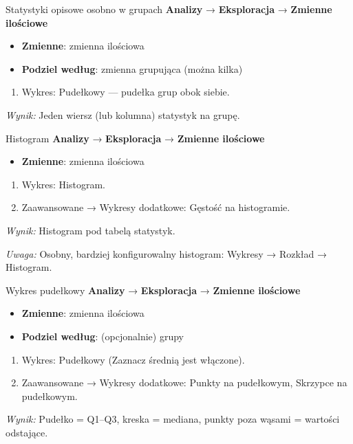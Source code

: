 \documentclass[
  polish,
  10pt,
  a4paper,
  DIV=11,
  numbers=noendperiod]{scrartcl}
\newcommand{\jmenu}[1]{{\color{upwraccent}\small #1}}
\begin{document}
\begin{jbox}{Statystyki opisowe osobno w grupach}\label{w:porownanie-grup-opis}
\jmenu{\textbf{Analizy} → \textbf{Eksploracja} → \textbf{Zmienne ilościowe}}

\begin{itemize}
\item[$\triangleright$] \textbf{Zmienne}: zmienna ilościowa
\item[$\triangleright$] \textbf{Podziel według}: zmienna grupująca (można kilka)
\end{itemize}
\begin{enumerate}
\item Wykres: Pudełkowy — pudełka grup obok siebie.
\end{enumerate}
\textit{Wynik:} Jeden wiersz (lub kolumna) statystyk na grupę.

\end{jbox}

\begin{jbox}{Histogram}\label{w:histogram}
\jmenu{\textbf{Analizy} → \textbf{Eksploracja} → \textbf{Zmienne ilościowe}}

\begin{itemize}
\item[$\triangleright$] \textbf{Zmienne}: zmienna ilościowa
\end{itemize}
\begin{enumerate}
\item Wykres: Histogram.
\item Zaawansowane → Wykresy dodatkowe: Gęstość na histogramie.
\end{enumerate}
\textit{Wynik:} Histogram pod tabelą statystyk.

{\color{upwrsoft}\small\textit{Uwaga:} Osobny, bardziej konfigurowalny histogram: Wykresy → Rozkład → Histogram.}
\end{jbox}

\begin{jbox}{Wykres pudełkowy}\label{w:pudelkowy}
\jmenu{\textbf{Analizy} → \textbf{Eksploracja} → \textbf{Zmienne ilościowe}}

\begin{itemize}
\item[$\triangleright$] \textbf{Zmienne}: zmienna ilościowa
\item[$\triangleright$] \textbf{Podziel według}: (opcjonalnie) grupy
\end{itemize}
\begin{enumerate}
\item Wykres: Pudełkowy (Zaznacz średnią jest włączone).
\item Zaawansowane → Wykresy dodatkowe: Punkty na pudełkowym, Skrzypce na pudełkowym.
\end{enumerate}
\textit{Wynik:} Pudełko = Q1–Q3, kreska = mediana, punkty poza wąsami = wartości odstające.

\end{jbox}
\end{document}
